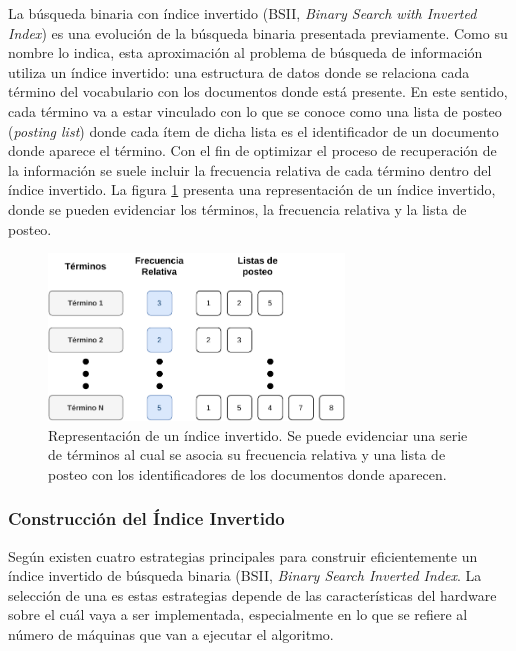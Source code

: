 La búsqueda binaria con índice invertido (BSII, \textit{Binary Search with Inverted Index}) es una evolución de la búsqueda binaria presentada previamente. Como su nombre lo indica, esta aproximación al problema de búsqueda de información utiliza un índice invertido: una estructura de datos donde se relaciona cada término del vocabulario con los documentos donde está presente. En este sentido, cada término va a estar vinculado con lo que se conoce como una lista de posteo (\textit{posting list}) donde cada ítem de dicha lista es el identificador de un documento donde aparece el término. Con el fin de optimizar el proceso de recuperación de la información se suele incluir la frecuencia relativa de cada término dentro del índice invertido. La figura \ref{fig:inverted_index} presenta una representación de un índice invertido, donde se pueden evidenciar los términos, la frecuencia relativa y la lista de posteo.

\begin{figure}[ht]
    \centering
    \includegraphics[width=0.7\textwidth]{images/BSII/II.pdf}
    \caption{Representación de un índice invertido. Se puede evidenciar una serie de términos al cual se asocia su frecuencia relativa y una lista de posteo con los identificadores de los documentos donde aparecen.}
    \label{fig:inverted_index}
\end{figure}

\subsubsection{Construcción del Índice Invertido}
Según \cite{IR-book} existen cuatro estrategias principales para construir eficientemente un índice invertido de búsqueda binaria (BSII, \textit{Binary Search Inverted Index}. La selección de una es estas estrategias depende de las características del hardware sobre el cuál vaya a ser implementada, especialmente en lo que se refiere al número de máquinas que van a ejecutar el algoritmo. 

